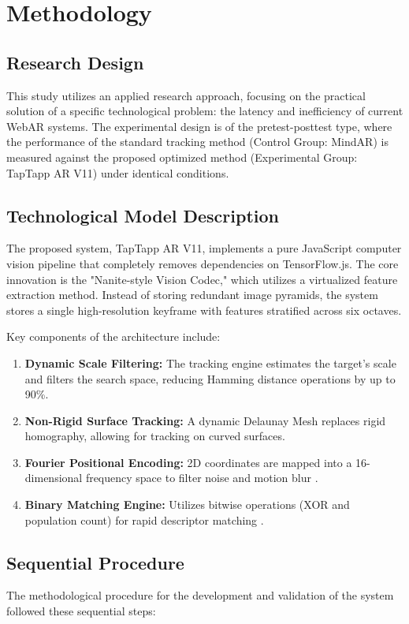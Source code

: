 \section{Methodology}

\subsection{Research Design}
This study utilizes an applied research approach, focusing on the practical solution of a specific technological problem: the latency and inefficiency of current WebAR systems. The experimental design is of the pretest-posttest type, where the performance of the standard tracking method (Control Group: MindAR) is measured against the proposed optimized method (Experimental Group: TapTapp AR V11) under identical conditions.

\subsection{Technological Model Description}
The proposed system, TapTapp AR V11, implements a pure JavaScript computer vision pipeline that completely removes dependencies on TensorFlow.js. The core innovation is the "Nanite-style Vision Codec," which utilizes a virtualized feature extraction method. Instead of storing redundant image pyramids, the system stores a single high-resolution keyframe with features stratified across six octaves.

Key components of the architecture include:
\begin{enumerate}
    \item \textbf{Dynamic Scale Filtering:} The tracking engine estimates the target's scale and filters the search space, reducing Hamming distance operations by up to 90\%.
    \item \textbf{Non-Rigid Surface Tracking:} A dynamic Delaunay Mesh replaces rigid homography, allowing for tracking on curved surfaces.
    \item \textbf{Fourier Positional Encoding:} 2D coordinates are mapped into a 16-dimensional frequency space to filter noise and motion blur \cite{garcia2025fourier}.
    \item \textbf{Binary Matching Engine:} Utilizes bitwise operations (XOR and population count) for rapid descriptor matching \cite{wu2023binary}.
\end{enumerate}

\subsection{Sequential Procedure}
The methodological procedure for the development and validation of the system followed these sequential steps:

